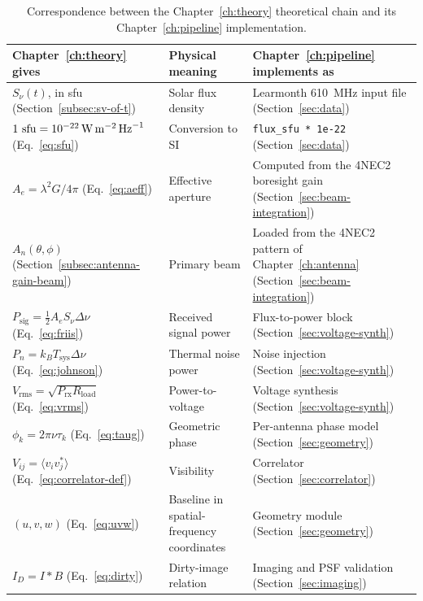 \begin{table}[H]
  \centering
  \caption[Correspondence between the Chapter~2 theoretical chain and its Chapter~4 implementation]{Correspondence between the Chapter~\ref{ch:theory} theoretical chain and its Chapter~\ref{ch:pipeline} implementation.}
  \label{tab:theory-to-pipeline}
  \renewcommand{\arraystretch}{1.3}
  \begin{tabularx}{\textwidth}{l >{\raggedright\arraybackslash}X >{\raggedright\arraybackslash}X}
    \toprule
    \textbf{Chapter~\ref{ch:theory} gives} & \textbf{Physical meaning} & \textbf{Chapter~\ref{ch:pipeline} implements as} \\
    \midrule
    $S_\nu(t)$, in sfu (Section~\ref{subsec:sv-of-t}) & Solar flux density & Learmonth \SI{610}{\mega\hertz} input file (Section~\ref{sec:data}) \\
    $1~\mathrm{sfu}=\SI{e-22}{\watt\per\square\metre\per\hertz}$ (Eq.~\eqref{eq:sfu}) & Conversion to SI & \texttt{flux\_sfu * 1e-22} (Section~\ref{sec:data}) \\
    $A_e=\lambda^2 G/4\pi$ (Eq.~\eqref{eq:aeff}) & Effective aperture & Computed from the 4NEC2 boresight gain (Section~\ref{sec:beam-integration}) \\
    $A_n(\theta,\phi)$ (Section~\ref{subsec:antenna-gain-beam}) & Primary beam & Loaded from the 4NEC2 pattern of Chapter~\ref{ch:antenna} (Section~\ref{sec:beam-integration}) \\
    $P_\mathrm{sig}=\tfrac12 A_e S_\nu \Delta\nu$ (Eq.~\eqref{eq:friis}) & Received signal power & Flux-to-power block (Section~\ref{sec:voltage-synth}) \\
    $P_n=k_B T_\mathrm{sys}\Delta\nu$ (Eq.~\eqref{eq:johnson}) & Thermal noise power & Noise injection (Section~\ref{sec:voltage-synth}) \\
    $V_\mathrm{rms}=\sqrt{P_\mathrm{rx}R_\mathrm{load}}$ (Eq.~\eqref{eq:vrms}) & Power-to-voltage & Voltage synthesis (Section~\ref{sec:voltage-synth}) \\
    $\phi_k=2\pi\nu\tau_k$ (Eq.~\eqref{eq:taug}) & Geometric phase & Per-antenna phase model (Section~\ref{sec:geometry}) \\
    $V_{ij}=\langle v_i v_j^*\rangle$ (Eq.~\eqref{eq:correlator-def}) & Visibility & Correlator (Section~\ref{sec:correlator}) \\
    $(u,v,w)$ (Eq.~\eqref{eq:uvw}) & Baseline in spatial-frequency coordinates & Geometry module (Section~\ref{sec:geometry}) \\
    $I_D=I*B$ (Eq.~\eqref{eq:dirty}) & Dirty-image relation & Imaging and PSF validation (Section~\ref{sec:imaging}) \\
    \bottomrule
  \end{tabularx}
\end{table}

